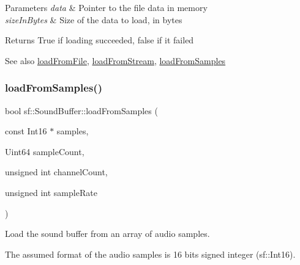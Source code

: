 \begin{DoxyParams}{Parameters}
{\em data} & Pointer to the file data in memory \\
\hline
{\em size\+In\+Bytes} & Size of the data to load, in bytes\\
\hline
\end{DoxyParams}
\begin{DoxyReturn}{Returns}
True if loading succeeded, false if it failed
\end{DoxyReturn}
\begin{DoxySeeAlso}{See also}
\mbox{\hyperlink{classsf_1_1_sound_buffer_a2be6a8025c97eb622a7dff6cf2594394}{load\+From\+File}}, \mbox{\hyperlink{classsf_1_1_sound_buffer_ad292156b1e01f6dabd4c0c277d5e079e}{load\+From\+Stream}}, \mbox{\hyperlink{classsf_1_1_sound_buffer_a42d51ce4bb3b60c7ea06f63c273fd063}{load\+From\+Samples}} \begin{DoxyVerb}\end{DoxyVerb}
 
\end{DoxySeeAlso}
\mbox{\label{classsf_1_1_sound_buffer_a42d51ce4bb3b60c7ea06f63c273fd063}} 
\subsubsection{\texorpdfstring{loadFromSamples()}{loadFromSamples()}}
{\footnotesize\ttfamily bool sf\+::\+Sound\+Buffer\+::load\+From\+Samples (\begin{DoxyParamCaption}\item[{const Int16 $\ast$}]{samples,  }\item[{Uint64}]{sample\+Count,  }\item[{unsigned int}]{channel\+Count,  }\item[{unsigned int}]{sample\+Rate }\end{DoxyParamCaption})}



Load the sound buffer from an array of audio samples. 

The assumed format of the audio samples is 16 bits signed integer (sf\+::\+Int16).


